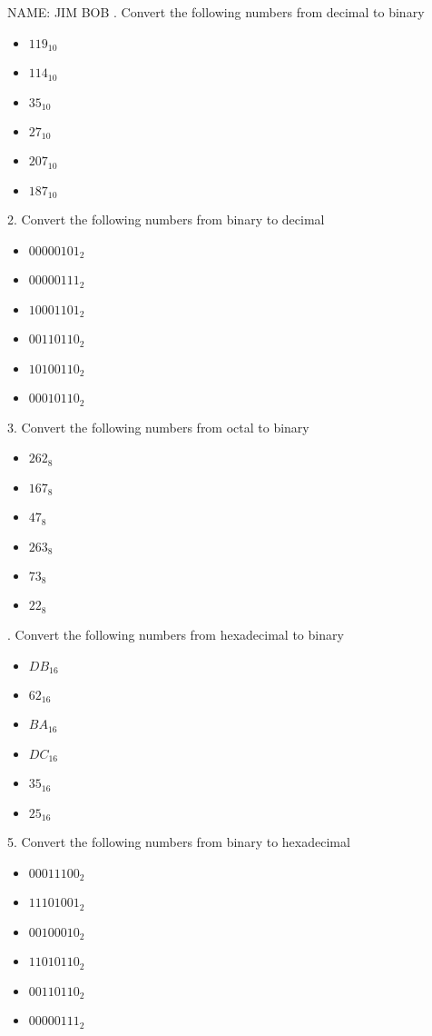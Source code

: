 \documentclass[a4paper,12pt]{article}
\begin{document}
NAME: JIM BOB
\newline{}. Convert the following numbers from decimal to binary
\begin{itemize}
\item $119_{10}$
\item $114_{10}$
\item $35_{10}$
\item $27_{10}$
\item $207_{10}$
\item $187_{10}$
\end{itemize}
2. Convert the following numbers from binary to decimal 
\begin{itemize}
\item $00000101_{2}$
\item $00000111_{2}$
\item $10001101_{2}$
\item $00110110_{2}$
\item $10100110_{2}$
\item $00010110_{2}$
\end{itemize}
3. Convert the following numbers from octal to binary 
\begin{itemize}
\item $262_{8}$
\item $167_{8}$
\item $47_{8}$
\item $263_{8}$
\item $73_{8}$
\item $22_{8}$
\end{itemize}. Convert the following numbers from hexadecimal to binary 
\begin{itemize}
\item $DB_{16}$
\item $62_{16}$
\item $BA_{16}$
\item $DC_{16}$
\item $35_{16}$
\item $25_{16}$
\end{itemize}
5. Convert the following numbers from binary to hexadecimal 
\begin{itemize}
\item $00011100_{2}$
\item $11101001_{2}$
\item $00100010_{2}$
\item $11010110_{2}$
\item $00110110_{2}$
\item $00000111_{2}$
\end{itemize}\newpage
\end{document}
